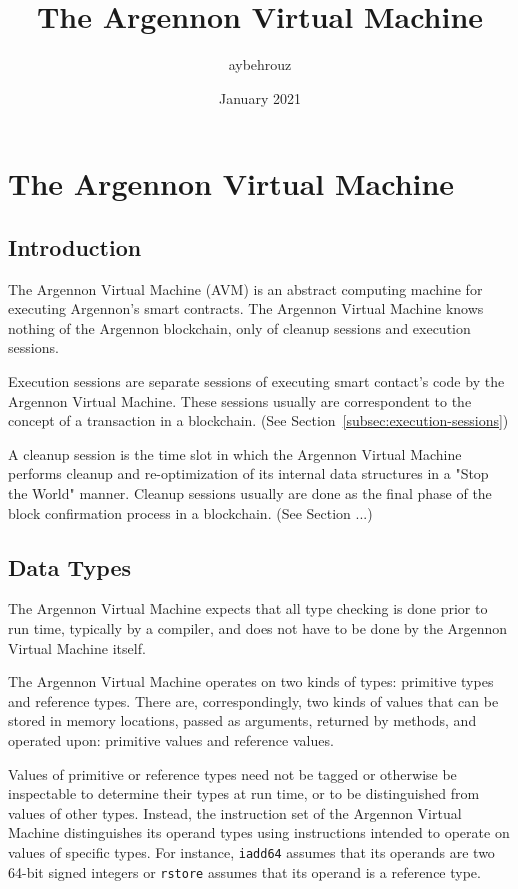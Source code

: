 \documentclass[11pt, a4paper]{report}
\title{The Argennon Virtual Machine}
\author{aybehrouz}
\date{January 2021}
\begin{document}
    \maketitle
    \tableofcontents


    \chapter{The Argennon Virtual Machine}\label{ch:AVM}


    \section{Introduction}\label{sec:introduction}

    The Argennon Virtual Machine (AVM) is an abstract computing machine for executing Argennon's smart contracts. The
    Argennon Virtual Machine knows nothing of the Argennon blockchain, only of cleanup sessions and
    execution sessions.

    Execution sessions are separate sessions of executing smart contact's code by the Argennon Virtual Machine.
    These sessions usually are correspondent to the concept of a transaction in a blockchain. (See
    Section~\ref{subsec:execution-sessions})

    A cleanup session is the time slot in which the Argennon Virtual Machine performs cleanup and re-optimization of
    its internal data structures in a "Stop the World" manner. Cleanup sessions usually are done as the final phase of
    the block confirmation process in a blockchain. (See Section ...)


    \section{Data Types}\label{sec:data-types}

    The Argennon Virtual Machine expects that all type checking is done prior to run time, typically by a compiler,
    and does not have to be done by the Argennon Virtual Machine itself.

    The Argennon Virtual Machine operates on two kinds of types: primitive types and reference types. There are,
    correspondingly, two kinds of values that can be stored in memory locations, passed as arguments, returned by
    methods, and operated upon: primitive values and reference values.

    Values of primitive or reference types need not be tagged or otherwise be inspectable to determine their types
    at run time, or to be distinguished from values of other types. Instead, the instruction set of the Argennon
    Virtual Machine distinguishes its operand types using instructions intended to operate on values of specific
    types. For instance, \texttt{iadd64} assumes that its operands are two 64-bit signed integers or \texttt{rstore}
    assumes that its operand is a reference type.
\end{document}
